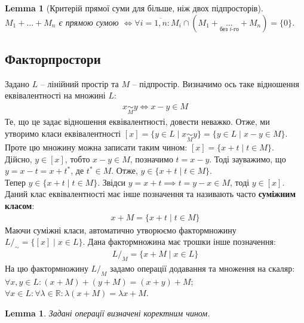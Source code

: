 \documentclass[a4paper, 10pt]{article}
\theoremstyle{theoremdd}
\newtheorem{lemma}[theorem]{Lemma}
\begin{document}
	\begin{lemma}[Критерій прямої суми для більше, ніж двох підпросторів]
	$M_1 + \dots + M_n$ є прямою сумою $\iff \forall i = \overline{1,n}: M_i \cap (M_1 + \underset{\text{без $i$-го}}{\dots} + M_n ) = \{0\}$.
	\end{lemma}
	
	\subsection{Факторпростори}
	Задано $L$ -- лінійний простір та $M$ -- підпростір. Визначимо ось таке відношення еквівалентності на множині $L$:
	\begin{align*}
	x \underset{M}{\sim} y \iff x-y \in M
	\end{align*}
	Те, що це задає відношення еквівалентності, довести неважко. Отже, ми утворимо класи еквівалентності $[x] = \{y \in L \mid x \underset{M}{\sim} y \} = \{ y \in L \mid x-y \in M\}$. Проте цю множину можна записати таким чином: $[x] = \{x+t \mid t \in M\}$.\\
	Дійсно, $y \in [x]$, тобто $x-y \in M$, позначимо $t = x-y$. Тоді зауважимо, що $y = x-t = x + t^*$, де $t^* \in M$. Отже, $y \in \{x+t \mid t \in M\}$.\\
	Тепер $y \in \{x+t \mid t \in M\}$. Звідси $y = x+t \implies t = y-x \in M$, тоді $y \in [x]$.\\
	Даний клас еквівалентності має інше позначення та називають часто \textbf{суміжним класом}:
	\begin{align*}
	x + M = \{ x + t \mid t \in M\}
	\end{align*}
	Маючи суміжні класи, автоматично утворюємо фактормножину $L/_{\sim} = \{ [x] \mid x \in L\}$. Дана фактормножина має трошки інше позначення:
	\begin{align*}
	L/_M = \{x + M \mid x \in L\}
	\end{align*}
	На цю фактормножину $L/_M$ задамо операції додавання та множення на скаляр:\\
	$\forall x,y \in L: (x+M)+(y+M) = (x+y)+M$;\\
	$\forall x \in L: \forall \lambda \in \mathbb{R}: \lambda(x+M) = \lambda x + M$.
	
	\begin{lemma}
	Задані операції визначені коректним чином.
	\end{lemma}
	
\end{document}
